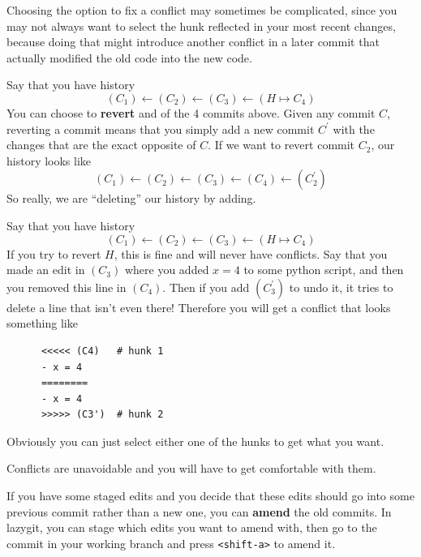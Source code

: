   Choosing the option to fix a conflict may sometimes be complicated, since you may not always want to select the hunk reflected in your most recent changes, because doing that might introduce another conflict in a later commit that actually modified the old code into the new code. 

  \begin{definition}
    \label{def:revert-commit}
 
    Say that you have history
    \begin{equation}
      (C_1) \leftarrow (C_2) \leftarrow (C_3) \leftarrow (H \mapsto C_4)
    \end{equation} 
    You can choose to \textbf{revert} and of the 4 commits above. Given any commit $C$, reverting a commit means that you simply add a new commit $C^\prime$ with the changes that are the exact opposite of $C$. If we want to revert commit $C_2$, our history looks like 
    \begin{equation}
      (C_1) \leftarrow (C_2) \leftarrow (C_3) \leftarrow (C_4) \leftarrow (C_2^\prime)
    \end{equation}  
    So really, we are ``deleting'' our history by adding. 
  \end{definition} 

  \begin{example}
    \label{ex:conflicts-in-reverting}
    Say that you have history
    \begin{equation}
      (C_1) \leftarrow (C_2) \leftarrow (C_3) \leftarrow (H \mapsto C_4)
    \end{equation} 
    If you try to revert $H$, this is fine and will never have conflicts. Say that you made an edit in $(C_3)$ where you added $x = 4$ to some python script, and then you removed this line in $(C_4)$. Then if you add $(C_3^\prime)$ to undo it, it tries to delete a line that isn't even there! Therefore you will get a conflict that looks something like 
    \begin{lstlisting}
      <<<<< (C4)   # hunk 1 
      - x = 4 
      ========
      - x = 4
      >>>>> (C3')  # hunk 2
    \end{lstlisting}
    Obviously you can just select either one of the hunks to get what you want. 
  \end{example} 

  Conflicts are unavoidable and you will have to get comfortable with them.  

  \begin{definition}
    \label{def:amending-a-commit}
    If you have some staged edits and you decide that these edits should go into some previous commit rather than a new one, you can \textbf{amend} the old commits. In lazygit, you can stage which edits you want to amend with, then go to the commit in your working branch and press \texttt{<shift-a>} to amend it. 
  \end{definition}

